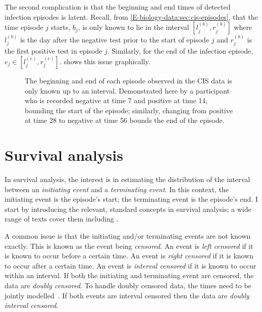 \documentclass[thesis.tex]{subfiles}
\begin{document}
The second complication is that the beginning and end times of detected infection episodes is latent.
Recall, from \cref{E-biology-data:sec:cis-episodes}, that the time episode $j$ starts, $b_j$, is only known to lie in the interval $[l_j^{(b)}, r_j^{(b)}]$ where $l_j^{(b)}$ is the day after the negative test prior to the start of episode $j$ and $r_j^{(b)}$ is the first positive test in episode $j$.
Similarly, for the end of the infection episode, $e_j \in [l_j^{(e)}, r_j^{(e)}]$.
 shows this issue graphically.
\begin{figure}
  \caption[Double-interval censoring in CIS data]{%
        The beginning and end of each episode observed in the CIS data is only known up to an interval.
        Demonstrated here by a participant who is recorded negative at time 7 and positive at time 14, bounding the start of the episode; similarly, changing from positive at time 28 to negative at time 56 bounds the end of the episode.
    }
    \label{perf-test:fig:double-interval-censor}
\end{figure}

\section{Survival analysis} \label{perf-test:sec:surv-analysis}

In survival analysis, the interest is in estimating the distribution of the interval between an \emph{initiating event} and a \emph{terminating event}.
In this context, the initiating event is the episode's start; the terminating event is the episode's end.
I start by introducing the relevant, standard concepts in survival analysis; a wide range of texts cover them including \textcite[chapter 1]{bogaertsSurvival}.

A common issue is that the initiating and/or terminating events are not known exactly.
This is known as the event being \emph{censored}.
An event is \emph{left censored} if it is known to occur before a certain time.
An event is \emph{right censored} if it is known to occur after a certain time.
An event is \emph{interval censored} if it is known to occur within an interval.
If both the initiating and terminating event are censored, the data are \emph{doubly censored}.
To handle doubly censored data, the times need to be jointly modelled~\autocite[and references therein]{liSemiparametric}.
If both events are interval censored then the data are \emph{doubly interval censored}.
\end{document}
